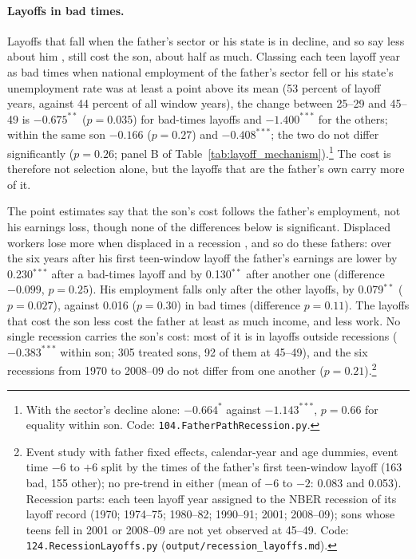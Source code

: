 \paragraph{Layoffs in bad times.} Layoffs that fall when the father's sector or his state is in decline, and so say
less about him \citep{gibbons1991layoffs}, still cost the son, about half as much. Classing each teen layoff year as bad
times when national employment of the father's sector fell or his state's unemployment rate was at least a point above
its mean (53 percent of layoff years, against 44 percent of all window years), the change between 25--29 and 45--49 is
$-0.675^{**}$ ($p = 0.035$) for bad-times layoffs and $-1.400^{***}$ for the others; within the same son $-0.166$ ($p =
0.27$) and $-0.408^{***}$; the two do not differ significantly ($p = 0.26$; panel B of
Table~\ref{tab:layoff_mechanism}).\footnote{With the sector's decline alone: $-0.664^{*}$ against $-1.143^{***}$, $p =
0.66$ for equality within son. Code: \texttt{104.FatherPathRecession.py}.} The cost is therefore not selection alone, but
the layoffs that are the father's own carry more of it.

The point estimates say that the son's cost follows the father's employment, not his earnings loss, though none of
the differences below is significant. Displaced workers lose more when
displaced in a recession \citep{davis2011recessions}, and so do these fathers: over the six years after his first
teen-window layoff the father's earnings are lower by 0.230$^{***}$ after a bad-times layoff and by 0.130$^{**}$ after
another one (difference $-0.099$, $p = 0.25$). His employment falls only after the other layoffs, by 0.079$^{**}$
($p = 0.027$), against 0.016 ($p = 0.30$) in bad times (difference $p = 0.11$). The layoffs that cost the son less cost the father at least as
much income, and less work. No single recession carries the son's cost: most of it is in layoffs outside recessions
($-0.383^{***}$ within son; 305 treated sons, 92 of them at 45--49), and the six recessions from 1970 to 2008--09 do not
differ from one another ($p = 0.21$).\footnote{Event study with father fixed effects, calendar-year and age dummies,
event time $-6$ to $+6$ split by the times of the father's first teen-window layoff (163 bad, 155 other); no pre-trend in
either (mean of $-6$ to $-2$: 0.083 and 0.053). Recession parts: each teen layoff year assigned to the NBER recession of
its layoff record (1970; 1974--75; 1980--82; 1990--91; 2001; 2008--09); sons whose teens fell in 2001 or 2008--09 are
not yet observed at 45--49. Code: \texttt{124.RecessionLayoffs.py} (\texttt{output/recession\_layoffs.md}).}

